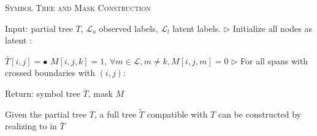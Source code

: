 \begin{algorithm}[t!]
  \small
  \caption{\label{alg:build_mask} \textsc{Symbol Tree and Mask Construction}}
  \begin{algorithmic}[1]
  
  \State Input: partial tree $T$, $\mathcal{L}_o$ observed labels, $\mathcal{L}_l$ latent labels. 
  \State $\triangleright$ Initialize all nodes as latent \scalebox{0.8}{$\square$}:
  \State {}
     
      \State $\bar{T}[i, j] = \bullet$ 
      \State $M[i, j, k] = 1$, $\forall m \in \mathcal{L}, m \ne k, M[i, j, m] = 0$ \label{alg:line_observed_mask}
\State $\triangleright$ For all spans with crossed boundaries with $(i, j)$:
      \State {}
\State {}
    \EndIf
  \EndFor

  \State Return: symbol tree $\bar{T}$, mask $M$
  
\end{algorithmic}
\end{algorithm} 
Given the partial tree $T$, a full tree $\tilde{T}$ compatible with $T$ can be constructed by realizing \scalebox{0.8}{$\square$} to \scalebox{0.8}{$\blacksquare$} in $\bar{T}$
